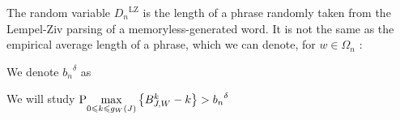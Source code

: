 \begin{rmk}
    The random variable ${D_n}^{\text{LZ}}$ is the
    length of a phrase randomly taken from the 
    Lempel-Ziv parsing 
    of a memoryless-generated word. It is not the same as
    the empirical average length of a phrase, which we can
    denote,
    for $w \in \Omega_n$ :
\end{rmk}

\begin{nota}
    We denote ${b_n}^{\delta}$ as
\end{nota}

\noindent
We will study
    \centers
    {$ \text{P}{ 
        \underset{ 0 \leqslant k \leqslant g_{\scriptscriptstyle W}(J) }{ \max } 
        \left\{ { B_{J, W}^k - k } \right\}
            > {b_n}^{\delta} } $}